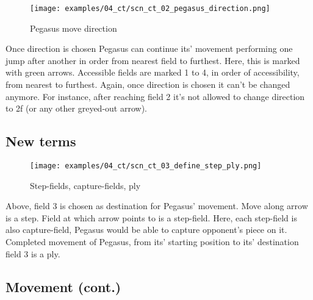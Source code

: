 \clearpage %

\noindent
\begin{figure}[!h]
\texttt{[image: examples/04\_ct/scn\_ct\_02\_pegasus\_direction.png]}
\caption{Pegasus move direction}
\label{fig:scn_ct_02_pegasus_direction}
\end{figure}

Once direction is chosen Pegasus can continue its' movement performing one jump
after another in order from nearest field to furthest. Here, this is marked
with green arrows. Accessible fields are marked 1 to 4, in order of accessibility,
from nearest to furthest. Again, once direction is chosen it can't be changed anymore.
For instance, after reaching field 2 it's not allowed to change direction to 2f (or
any other greyed-out arrow).

\clearpage %

\subsection*{New terms}

\noindent
\begin{figure}[!h]
\vspace{-1.0\baselineskip}
\texttt{[image: examples/04\_ct/scn\_ct\_03\_define\_step\_ply.png]}
\caption{Step-fields, capture-fields, ply}
\label{fig:scn_ct_03_define_step_ply}
\end{figure}

Above, field 3 is chosen as destination for Pegasus' movement. Move along arrow is a step.
Field at which arrow points to is a step-field. Here, each step-field is also capture-field,
Pegasus would be able to capture opponent's piece on it. Completed movement of Pegasus,
from its' starting position to its' destination field 3 is a ply.

\clearpage %

\subsection*{Movement (cont.)}

